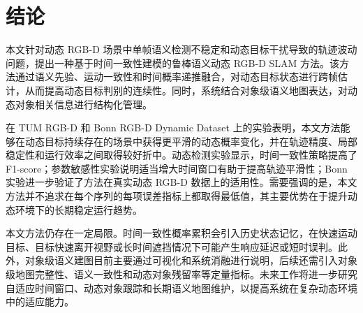 \section{结论}

本文针对动态 RGB-D 场景中单帧语义检测不稳定和动态目标干扰导致的轨迹波动问题，提出一种基于时间一致性建模的鲁棒语义动态 RGB-D SLAM 方法。该方法通过语义先验、运动一致性和时间概率递推融合，对动态目标状态进行跨帧估计，从而提高动态目标判别的连续性。同时，系统结合对象级语义地图表达，对动态对象相关信息进行结构化管理。

在 TUM RGB-D 和 Bonn RGB-D Dynamic Dataset 上的实验表明，本文方法能够在动态目标持续存在的场景中获得更平滑的动态概率变化，并在轨迹精度、局部稳定性和运行效率之间取得较好折中。动态检测实验显示，时间一致性策略提高了 F1-score；参数敏感性实验说明适当增大时间窗口有助于提高轨迹平滑性；Bonn 实验进一步验证了方法在真实动态 RGB-D 数据上的适用性。需要强调的是，本文方法并不追求在每个序列的每项误差指标上都取得最低值，其主要优势在于提升动态环境下的长期稳定运行趋势。

本文方法仍存在一定局限。时间一致性概率累积会引入历史状态记忆，在快速运动目标、目标快速离开视野或长时间遮挡情况下可能产生响应延迟或短时误判。此外，对象级语义建图目前主要通过可视化和系统消融进行说明，后续还需引入对象级地图完整性、语义一致性和动态对象残留率等定量指标。未来工作将进一步研究自适应时间窗口、动态对象跟踪和长期语义地图维护，以提高系统在复杂动态环境中的适应能力。

